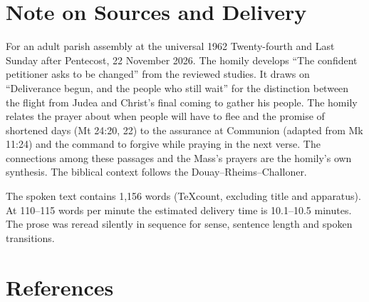 \section{Note on Sources and Delivery}

For an adult parish assembly at the universal 1962 Twenty-fourth and Last
Sunday after Pentecost, 22 November 2026. The homily develops ``The confident
petitioner asks to be changed'' from the reviewed studies. It draws on
``Deliverance begun, and the people who still wait'' for the distinction
between the flight from Judea and Christ's final coming to gather his
people. The homily relates the prayer about when people will have to flee
and the promise of shortened days (Mt 24:20, 22) to the assurance at
Communion (adapted from Mk 11:24) and the command to forgive while praying
in the next verse. The connections among these passages and the Mass's
prayers are the homily's own synthesis. The biblical context follows the
Douay--Rheims--Challoner.

The spoken text contains 1,156 words (TeXcount, excluding title and
apparatus). At 110--115 words per minute the estimated delivery time is
10.1--10.5 minutes. The prose was reread silently in sequence for sense,
sentence length and spoken transitions.

\section{References}

